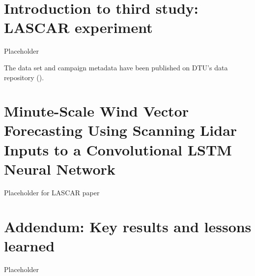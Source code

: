 \clearpage
\section{Introduction to third study: LASCAR experiment}
\label{sec:lascar_intro}

Placeholder

The data set and campaign metadata have been published on DTU's data repository (\cite{lascar_dataset}).

\clearpage
\section{Minute-Scale Wind Vector Forecasting Using Scanning Lidar Inputs to a Convolutional LSTM Neural Network}
\label{sec:lascar_paper}

Placeholder for LASCAR paper
%

\clearpage
\section{Addendum: Key results and lessons learned}
\label{sec:lascar_addendum}

Placeholder